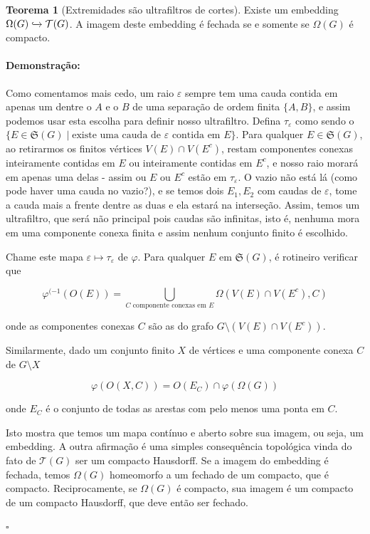 \documentclass[11pt]{article}
\newcommand{\pulinho}{\vspace{.5cm}}
\theoremstyle{definition}
\newtheorem{theorem}{Teorema}
\newenvironment{teorema}{
\definecolor{shadecolor}{HTML}{f59aa3}
\begin{shaded}
\begin{theorem}
}
{
\end{theorem}
\end{shaded}
}
\theoremstyle{definition}
\theoremstyle{definition}
\theoremstyle{definition}
\theoremstyle{definition}
\theoremstyle{definition}
\theoremstyle{definition}
\theoremstyle{definition}
\theoremstyle{definition}
\theoremstyle{definition}
\theoremstyle{definition}
\theoremstyle{definition}
\newenvironment{prova}{\paragraph{Demonstração:}}{\hfill$\square$ 
\pulinho
}
\begin{document}
\begin{teorema}[Extremidades são ultrafiltros de cortes]
    Existe um embedding $\Omega(G)\xhookrightarrow{} \mathcal{T}(G)$. A imagem deste embedding é fechada se e somente se $\Omega(G)$ é compacto.
\end{teorema}
\begin{prova}
Como comentamos mais cedo, um raio $\varepsilon$ sempre tem uma cauda contida em apenas um dentre o $A$ e o $B$ de uma separação de ordem finita $\{A,B\}$, e assim podemos usar esta escolha para definir nosso ultrafiltro. Defina $\tau_\varepsilon$ como sendo o  $\{E \in \mathfrak{S}(G) \mid \text{existe uma cauda de } \varepsilon \text{ contida em } E\}$. Para qualquer $E \in \mathfrak{S}(G)$, ao retirarmos os finitos vértices $V(E) \cap V(E^c)$, restam componentes conexas inteiramente contidas em $E$ ou inteiramente contidas em $E^c$, e nosso raio morará em apenas uma delas - assim ou $E$ ou $E^c$ estão em $\tau_\varepsilon$. O vazio não está lá (como pode haver uma cauda no vazio?), e se temos dois $E_1,E_2$ com caudas de $\varepsilon$, tome a cauda mais a frente dentre as duas e ela estará na interseção. Assim, temos um ultrafiltro, que será não principal pois caudas são infinitas, isto é, nenhuma mora em uma componente conexa finita e assim nenhum conjunto finito é escolhido.

Chame este mapa $\varepsilon \mapsto \tau_\varepsilon$ de $\varphi$. Para qualquer $E$ em $\mathfrak{S}(G)$, é rotineiro verificar que 

\[\varphi^{(-1}(O(E)) = \underset{C \text{ componente conexas em } E }{\bigcup} \Omega(V(E)\cap V(E^c),C) \]

onde as componentes conexas $C$ são as do grafo $G \setminus (V(E) \cap V(E^c))$. 

\pulinho

Similarmente, dado um conjunto finito $X$ de vértices e uma componente conexa $C$ de $G \setminus X$

\[
\varphi(O(X,C)) = O(E_C) \cap \varphi(\Omega(G))
\]

onde $E_C$ é o conjunto de todas as arestas com pelo menos uma ponta em $C$.

\pulinho

Isto mostra que temos um mapa contínuo e aberto sobre sua imagem, ou seja, um embedding. A outra afirmação é uma simples consequência topológica vinda do fato de $\mathcal{T}(G)$ ser um compacto Hausdorff. Se a imagem do embedding é fechada, temos $\Omega(G)$ homeomorfo a um fechado de um compacto, que é compacto. Reciprocamente, se $\Omega(G)$ é compacto, sua imagem é um compacto de um compacto Hausdorff, que deve então ser fechado.
    
\end{prova}
\end{document}
